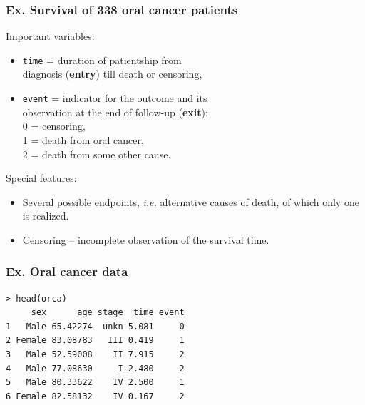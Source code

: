 \documentclass[handout,12pt]{beamer}
\begin{document}
\begin{frame}[fragile]
\frametitle{Ex. Survival of 338 oral cancer patients}

{Important variables}: 
\begin{itemize}
\item \texttt{time} = duration of patientship from \\ 
 diagnosis (\textbf{entry}) till death or censoring, 
\medskip
\item
\texttt{event} = indicator for the outcome and its \\
 observation at the end of follow-up (\textbf{exit}): \\
  0 = censoring,  \\
  1 = death from oral cancer, \\
  2 = death from some other cause.
\end{itemize}

\medskip
Special features:
\begin{itemize}
\item
   Several possible endpoints, \textit{i.e.} alternative causes of death, of which
   only one is realized.
   \medskip
\item
   Censoring -- incomplete observation of the survival time.   
\end{itemize}
\end{frame}



\begin{frame}[fragile]
\frametitle{Ex. Oral cancer data }

\begin{verbatim}
> head(orca)
     sex      age stage  time event
1   Male 65.42274  unkn 5.081     0
2 Female 83.08783   III 0.419     1
3   Male 52.59008    II 7.915     2
4   Male 77.08630     I 2.480     2
5   Male 80.33622    IV 2.500     1
6 Female 82.58132    IV 0.167     2
\end{verbatim}

\end{frame}
\end{document}
